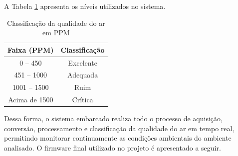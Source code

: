 \documentclass[a4paper,12pt]{article}
\begin{document}
A Tabela \ref{tab:qualidade_ar} apresenta os níveis utilizados no sistema.

\begin{table}[H]
\centering
\caption{Classificação da qualidade do ar em PPM}
\label{tab:qualidade_ar}
\begin{tabular}{|c|c|}
\hline
\textbf{Faixa (PPM)} & \textbf{Classificação} \\ \hline
0 -- 450 & Excelente \\ \hline
451 -- 1000 & Adequada \\ \hline
1001 -- 1500 & Ruim \\ \hline
Acima de 1500 & Crítica \\ \hline
\end{tabular}
\end{table}

Dessa forma, o sistema embarcado realiza todo o processo de aquisição, conversão, processamento e classificação da qualidade do ar em tempo real, permitindo monitorar continuamente as condições ambientais do ambiente analisado.
O firmware final utilizado no projeto é apresentado a seguir.
\end{document}
